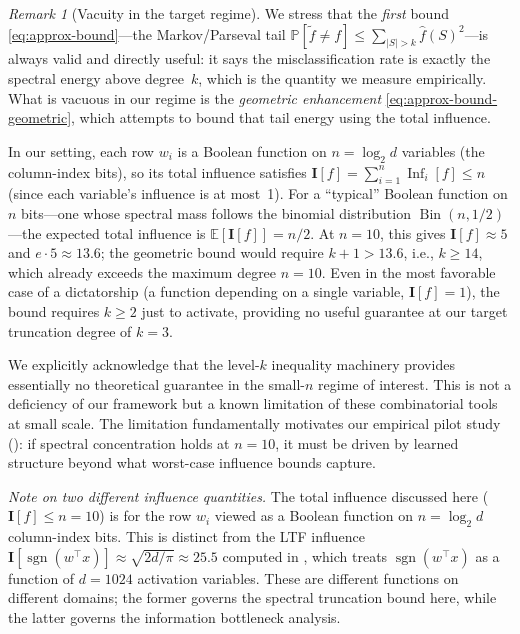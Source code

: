 \documentclass[12pt,a4paper]{article}
\theoremstyle{plain}
\theoremstyle{definition}
\theoremstyle{remark}
\newtheorem{remark}[theorem]{Remark}
\newcommand{\E}{\mathbb{E}}
\newcommand{\Prob}{\mathbb{P}}
\newcommand{\fhat}{\widehat{f}}
\newcommand{\sgn}{\operatorname{sgn}}
\newcommand{\Inf}{\operatorname{Inf}}
\begin{document}
\begin{remark}[Vacuity in the target regime]\label{rem:vacuity}
We stress that the \emph{first} bound \eqref{eq:approx-bound}---the Markov/Parseval tail $\Prob[\tilde f \neq f] \leq \sum_{|S|>k}\fhat(S)^2$---is always valid and directly useful: it says the misclassification rate is exactly the spectral energy above degree~$k$, which is the quantity we measure empirically. What is vacuous in our regime is the \emph{geometric enhancement} \eqref{eq:approx-bound-geometric}, which attempts to bound that tail energy using the total influence.

In our setting, each row $w_i$ is a Boolean function on $n = \log_2 d$ variables (the column-index bits), so its total influence satisfies $\mathbf{I}[f] = \sum_{i=1}^{n} \Inf_i[f] \leq n$ (since each variable's influence is at most~1). For a ``typical'' Boolean function on $n$ bits---one whose spectral mass follows the binomial distribution $\operatorname{Bin}(n, 1/2)$---the expected total influence is $\E[\mathbf{I}[f]] = n/2$. At $n = 10$, this gives $\mathbf{I}[f] \approx 5$ and $e \cdot 5 \approx 13.6$; the geometric bound would require $k + 1 > 13.6$, i.e., $k \geq 14$, which already exceeds the maximum degree $n = 10$. Even in the most favorable case of a dictatorship (a function depending on a single variable, $\mathbf{I}[f] = 1$), the bound requires $k \geq 2$ just to activate, providing no useful guarantee at our target truncation degree of $k = 3$.

We explicitly acknowledge that the level-$k$ inequality machinery provides essentially no theoretical guarantee in the small-$n$ regime of interest. This is not a deficiency of our framework but a known limitation of these combinatorial tools at small scale. The limitation fundamentally motivates our empirical pilot study (): if spectral concentration holds at $n = 10$, it must be driven by learned structure beyond what worst-case influence bounds capture.

\emph{Note on two different influence quantities.} The total influence discussed here ($\mathbf{I}[f] \leq n = 10$) is for the row $w_i$ viewed as a Boolean function on $n = \log_2 d$ column-index bits. This is distinct from the LTF influence $\mathbf{I}[\sgn(w^\top x)] \approx \sqrt{2d/\pi} \approx 25.5$ computed in , which treats $\sgn(w^\top x)$ as a function of $d = 1024$ activation variables. These are different functions on different domains; the former governs the spectral truncation bound here, while the latter governs the information bottleneck analysis.
\end{remark}
\end{document}
